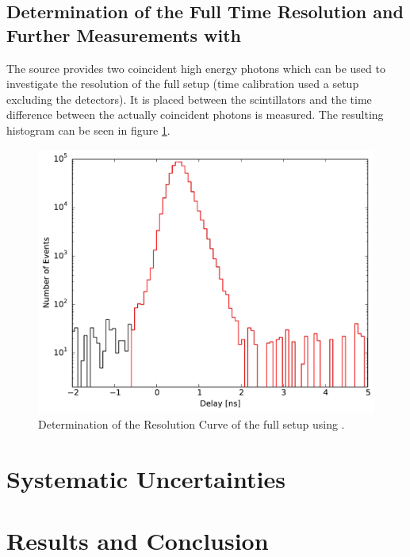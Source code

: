 \documentclass[
	paper=A4,
	parskip=full,
	chapterprefix=true,
	11pt,
	headings=normal,
	bibliography=totoc,
	listof=totoc,
	titlepage=on,
]{scrreprt}
\begin{document}
\section{Determination of the Full Time Resolution and Further Measurements with }
The  source provides two coincident high energy photons which can be used to investigate the resolution of the full setup (time calibration used a setup excluding the detectors). It is placed between the scintillators and the time difference between the actually coincident photons is measured. The resulting histogram can be seen in figure \ref{fig:resolution_peak}. 

\begin{figure}
	\centering
	\includegraphics{resolution_peak}
	\caption{Determination of the Resolution Curve of the full setup using .}
	\label{fig:resolution_peak}
\end{figure}




\chapter{Systematic Uncertainties}

\chapter{Results and Conclusion}


\cleardoublepage


{}
\end{document}
